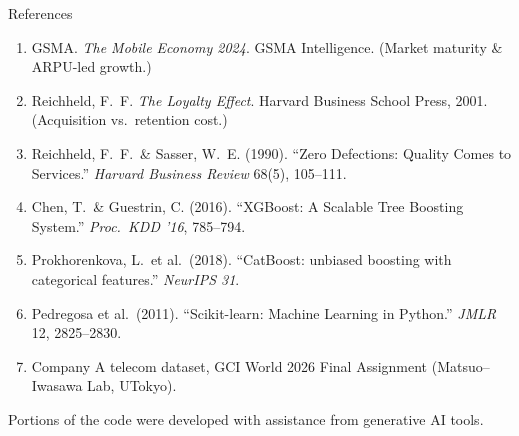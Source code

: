 \documentclass[aspectratio=169]{beamer}
\begin{document}
\begin{frame}{References}
    \footnotesize
    \begin{enumerate}
        \item GSMA. \textit{The Mobile Economy 2024}. GSMA Intelligence.
              (Market maturity \& ARPU-led growth.)
        \item Reichheld, F.\ F. \textit{The Loyalty Effect}. Harvard Business
              School Press, 2001. (Acquisition vs.\ retention cost.)
        \item Reichheld, F.\ F.\ \& Sasser, W.\ E. (1990). ``Zero Defections:
              Quality Comes to Services.'' \textit{Harvard Business Review}
              68(5), 105--111.
        \item Chen, T.\ \& Guestrin, C. (2016). ``XGBoost: A Scalable Tree
              Boosting System.'' \textit{Proc.\ KDD '16}, 785--794.
        \item Prokhorenkova, L.\ et al.\ (2018). ``CatBoost: unbiased boosting
              with categorical features.'' \textit{NeurIPS 31}.
        \item Pedregosa et al.\ (2011). ``Scikit-learn: Machine Learning in
              Python.'' \textit{JMLR} 12, 2825--2830.
        \item Company A telecom dataset, GCI World 2026 Final Assignment
              (Matsuo--Iwasawa Lab, UTokyo).
    \end{enumerate}
    \vfill
    {\fontsize{2}{3}\selectfont Portions of the code were developed with assistance from generative AI tools.}
\end{frame}

\end{document}
